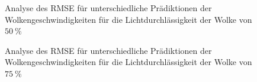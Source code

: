 \begin{figure}[h!]
    \centering
\setlength{\fboxsep}{1pt}
\setlength{\fboxrule}{1pt}
\caption[Analyse des RMSE für unterschiedliche Prädiktionen der Wolkengeschwindigkeiten für die Lichtdurchlässigkeit der Wolke von $\SI{50}{\percent}$]{Analyse des RMSE für unterschiedliche Prädiktionen der Wolkengeschwindigkeiten für die Lichtdurchlässigkeit der Wolke von $\SI{50}{\percent}$}
\label{fig_speed50RMSE}
\end{figure}

\begin{figure}[h!]
    \centering
    \setlength{\fboxsep}{1pt}
    \setlength{\fboxrule}{1pt}
    \caption[Analyse des RMSE für unterschiedliche Prädiktionen der Wolkengeschwindigkeiten für die Lichtdurchlässigkeit der Wolke von $\SI{75}{\percent}$]{Analyse des RMSE für unterschiedliche Prädiktionen der Wolkengeschwindigkeiten für die Lichtdurchlässigkeit der Wolke von $\SI{75}{\percent}$}
    \label{fig_speed75RMSE}
\end{figure}

